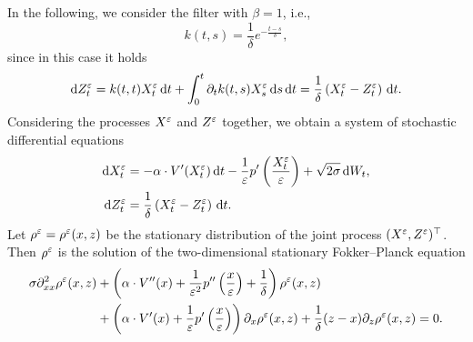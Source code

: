 \documentclass[10pt]{article}
\begin{document}
In the following, we consider the filter with $\beta = 1$, i.e.,
\begin{equation}
	k(t,s) = \frac{1}{\delta} e^{-\frac{t-s}{\delta}},
\end{equation}
since in this case it holds
\begin{equation}
	\mathrm{d} Z^\varepsilon_t = k(t,t) X^\varepsilon_t \,\mathrm{d} t + \int_0^t \partial_t k(t,s) X^\varepsilon_s \,\mathrm{d} s \,\mathrm{d} t = \frac{1}{\delta} \left ( X^\varepsilon_t - Z^\varepsilon_t \right ) \,\mathrm{d} t.
\end{equation}
Considering the processes $X^\varepsilon$ and $Z^\varepsilon$ together, we obtain a system of stochastic differential equations
\begin{equation}
\label{systemSDE}
\begin{aligned}
\mathrm{d} X_t^\varepsilon &= -\alpha \cdot V'(X_t^\varepsilon) \,\mathrm{d} t - \frac1{\varepsilon} p'\left(\frac{X_t^\varepsilon}{\varepsilon}\right) + \sqrt{2\sigma} \,\mathrm{d} W_t, \\
\mathrm{d} Z^\varepsilon_t &= \frac{1}{\delta} \left ( X^\varepsilon_t - Z^\varepsilon_t \right ) \,\mathrm{d} t.
\end{aligned}
\end{equation}
Let $\rho^\varepsilon = \rho^\varepsilon(x,z)$ be the stationary distribution of the joint process $(X^\varepsilon, Z^\varepsilon)^\top$.  Then $\rho^\varepsilon$ is the solution of the two-dimensional stationary Fokker--Planck equation
\begin{equation}
\begin{aligned}
	\label{eq:FPsystem}
	\sigma \partial^2_{xx} \rho^\varepsilon(x,z) & + \left ( \alpha \cdot V''(x) + \frac{1}{\varepsilon^2} p'' \left ( \frac{x}{\varepsilon} \right ) + \frac{1}{\delta} \right ) \rho^\varepsilon(x,z) \\
	& + \left ( \alpha \cdot V'(x) + \frac{1}{\varepsilon} p' \left ( \frac{x}{\varepsilon} \right ) \right ) \partial_x \rho^\varepsilon(x,z) + \frac{1}{\delta}(z - x) \partial_z \rho^\varepsilon(x,z) = 0.
\end{aligned}
\end{equation}
\end{document}
